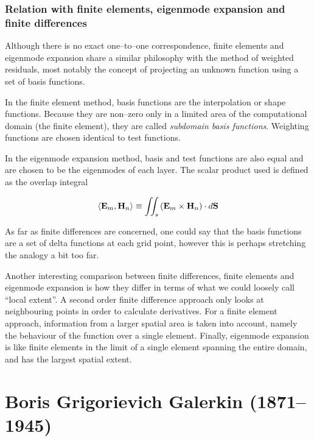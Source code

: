 \subsubsection{Relation with finite elements, eigenmode expansion and finite differences}

Although there is no exact one--to--one correspondence, finite elements and eigenmode expansion share a similar philosophy with the method of weighted residuals, most notably the concept of projecting an unknown function using a set of basis functions.

In the finite element method, basis functions are the interpolation or shape functions. Because they are non--zero only in a limited area of the computational domain (the finite element), they are called \emph{subdomain basis functions}. Weighting functions are chosen identical to test functions. 

In the eigenmode expansion method, basis and test functions are also equal and are chosen to be the eigenmodes of each layer. The scalar product used is defined as the overlap integral 

\begin{equation}
\left\langle \mathbf{E}_{m},\mathbf{H}_{n}\right\rangle \equiv \iint _{s}\left( \mathbf{E}_{m}\times \mathbf{H}_{n}\right) \cdot d{\bf S}
\end{equation}

As far as finite differences are concerned, one could say that the basis functions are a set of delta functions at each grid point, however this is perhaps stretching the analogy a bit too far.

Another interesting comparison between finite differences, finite elements and eigenmode expansion is how they differ in terms of what we could loosely call ``local extent''. A second order finite difference approach only looks at neighbouring points in order to calculate derivatives. For a finite element approach, information from a larger spatial area is taken into account, namely the behaviour of the function over a single element. Finally, eigenmode expansion is like finite elements in the limit of a single element spanning the entire domain, and has the largest spatial extent.


\pagebreak
\section*{Boris Grigorievich Galerkin (1871--1945)}

